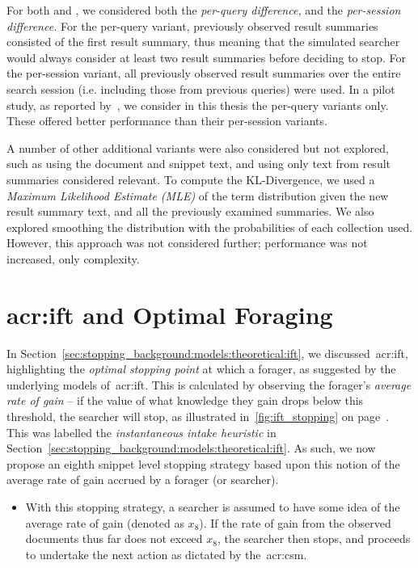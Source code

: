For both  and , we considered both the \emph{per-query difference,} and the \emph{per-session difference.} For the per-query variant, previously observed result summaries consisted of the first result summary, thus meaning that the simulated searcher would always consider at least two result summaries before deciding to stop. For the per-session variant, all previously observed result summaries over the entire search session (i.e. including those from previous queries) were used. In a pilot study, as reported by~\cite{maxwell2015initial_stopping}, we consider in this thesis the per-query variants only. These offered better performance than their per-session variants.

A number of other additional variants were also considered but not explored, such as using the document and snippet text, and using only text from result summaries considered relevant. To compute the KL-Divergence, we used a \emph{Maximum Likelihood Estimate (MLE)} of the term distribution given the new result summary text, and all the previously examined summaries. We also explored smoothing the distribution with the probabilities of each collection used. However, this approach was not considered further; performance was not increased, only complexity.

\section{\gls{acr:ift} and Optimal Foraging}
In Section~\ref{sec:stopping_background:models:theoretical:ift}, we discussed~\gls{acr:ift}, highlighting the \emph{optimal stopping point} at which a forager, as suggested by the underlying models of~\gls{acr:ift}. This is calculated by observing the forager's \emph{average rate of gain} -- if the value of what knowledge they gain drops below this threshold, the searcher will stop, as illustrated in~\ref{fig:ift_stopping} on page~\pageref{fig:ift_stopping}. This was labelled the \emph{instantaneous intake heuristic} in Section~\ref{sec:stopping_background:models:theoretical:ift}. As such, we now propose an eighth snippet level stopping strategy based upon this notion of the average rate of gain accrued by a forager (or searcher).

\begin{itemize}
    \item{ With this stopping strategy, a searcher is assumed to have some idea of the average rate of gain (denoted as $x_8$). If the rate of gain from the observed documents thus far does not exceed $x_8$, the searcher then stops, and proceeds to undertake the next action as dictated by the~\gls{acr:csm}.}
\end{itemize}

